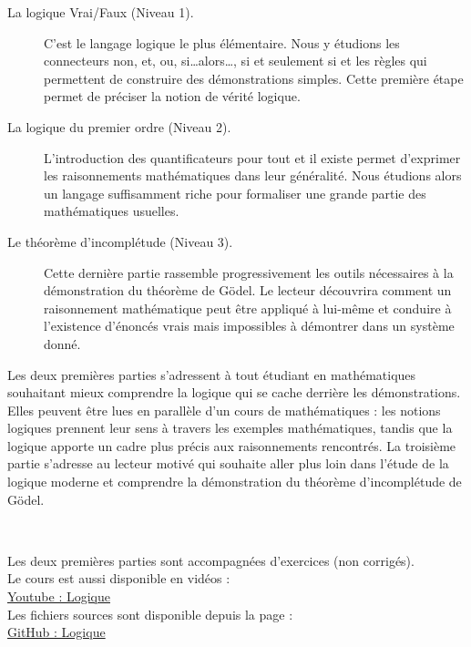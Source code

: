 \begin{description}
    \item[La logique Vrai/Faux (Niveau 1).] C'est le langage logique le plus élémentaire. Nous y étudions les connecteurs \og{}non\fg{}, \og{}et\fg{}, \og{}ou\fg{}, \og{}si\dots alors\dots\fg{}, \og{}si et seulement si\fg{} et les règles qui permettent de construire des démonstrations simples. Cette première étape permet de préciser la notion de vérité logique.

    \item[La logique du premier ordre (Niveau 2).] L'introduction des quantificateurs \og{}pour tout\fg{} et \og{}il existe\fg{} permet d'exprimer les raisonnements mathématiques dans leur généralité. Nous étudions alors un langage suffisamment riche pour formaliser une grande partie des mathématiques usuelles.

    \item[Le théorème d'incomplétude (Niveau 3).] Cette dernière partie rassemble progressivement les outils nécessaires à la démonstration du théorème de Gödel. Le lecteur découvrira comment un raisonnement mathématique peut être appliqué à lui-même et conduire à l'existence d'énoncés vrais mais impossibles à démontrer dans un système donné.
\end{description}

Les deux premières parties s'adressent à tout étudiant en mathématiques souhaitant mieux comprendre la logique qui se cache derrière les démonstrations. Elles peuvent être lues en parallèle d'un cours de mathématiques : les notions logiques prennent leur sens à travers les exemples mathématiques, tandis que la logique apporte un cadre plus précis aux raisonnements rencontrés. La troisième partie s'adresse au lecteur motivé qui souhaite aller plus loin dans l'étude de la logique moderne et comprendre la démonstration du théorème d'incomplétude de Gödel.
  

~
\bigskip
\vfill
\begin{center}
Les deux premières parties sont accompagnées d'exercices (non corrigés).\\
Le cours est aussi disponible en vidéos :\\
\href{https://www.youtube.com/@Logique-Exo7}{Youtube : \og{}Logique\fg{}}\\    
Les fichiers sources sont disponible depuis la page :\\
\href{https://exo7math.github.io/logique-exo7/}{\og{}GitHub : Logique\fg{}}
\end{center}
\vfill


